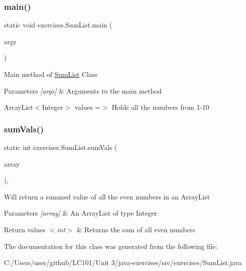 \subsubsection{\texorpdfstring{main()}{main()}}
{\footnotesize\ttfamily static void exercises.\+Sum\+List.\+main (\begin{DoxyParamCaption}\item[{String \mbox{[}$\,$\mbox{]}}]{args }\end{DoxyParamCaption})\hspace{0.3cm}{\ttfamily [static]}}

Main method of \mbox{\hyperlink{classexercises_1_1_sum_list}{Sum\+List}} Class 
\begin{DoxyParams}{Parameters}
{\em \mbox{[}args\mbox{]}} & Arguments to the main method \\
\hline
\end{DoxyParams}
Array\+List$<$\+Integer$>$ values =$>$ Holds all the numbers from 1-\/10 \mbox{\label{classexercises_1_1_sum_list_a04969d5dd6fdae5d0a6b550c3dcd0bfc}} 
\subsubsection{\texorpdfstring{sumVals()}{sumVals()}}
{\footnotesize\ttfamily static int exercises.\+Sum\+List.\+sum\+Vals (\begin{DoxyParamCaption}\item[{Array\+List$<$ Integer $>$}]{array }\end{DoxyParamCaption})\hspace{0.3cm}{\ttfamily [static]}, {\ttfamily [private]}}

Will return a summed value of all the even numbers in an Array\+List 
\begin{DoxyParams}{Parameters}
{\em \mbox{[}array\mbox{]}} & An Array\+List of type Integer \\
\hline
\end{DoxyParams}

\begin{DoxyRetVals}{Return values}
{\em $<$int$>$} & Returns the sum of all even numbers \\
\hline
\end{DoxyRetVals}


The documentation for this class was generated from the following file\+:\begin{DoxyCompactItemize}
\item 
C\+:/\+Users/user/github/\+L\+C101/\+Unit 3/java-\/exercises/src/exercises/Sum\+List.\+java\end{DoxyCompactItemize}
